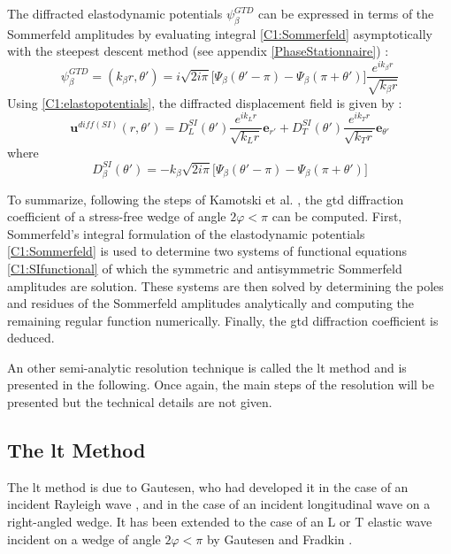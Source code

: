 The diffracted elastodynamic potentials $\psi_{\beta}^{GTD} $ can be expressed in terms of the Sommerfeld amplitudes by evaluating integral \eqref{C1:Sommerfeld} asymptotically with the steepest descent method (see appendix \ref{PhaseStationnaire}) :
\begin{equation}
\psi_{\beta}^{GTD}=(k_{\beta} r,\theta')=i\sqrt{2i\pi}\lbrack \Psi_{\beta}(\theta'-\pi)-\Psi_{\beta}(\pi+\theta')\rbrack \dfrac{e^{ik_{\beta}r}}{\sqrt{k_{\beta}r}}
\end{equation}
Using \eqref{C1:elastopotentials}, the diffracted displacement field is given by :
\begin{equation}
\mathbf{u}^{diff(SI)}(r,\theta')=D_L^{SI}(\theta')\dfrac{e^{ik_Lr}}{\sqrt{k_Lr}}\mathbf{e}_{r'}+D_T^{SI}(\theta')\dfrac{e^{ik_Tr}}{\sqrt{k_Tr}}\mathbf{e}_{\theta'}
\end{equation}
where
\begin{equation}
D_{\beta}^{SI}(\theta')=-k_{\beta}\sqrt{2i\pi}\lbrack \Psi_{\beta}(\theta'-\pi)-\Psi_{\beta}(\pi+\theta')\rbrack
\end{equation}

To summarize, following the steps of Kamotski et al. \cite{KamotskiFradkin}, the \acrshort{gtd} diffraction coefficient of a stress-free wedge of angle $2\varphi<\pi$ can be computed. First, Sommerfeld's integral formulation of the elastodynamic potentials \eqref{C1:Sommerfeld} is used to determine two systems of functional equations \eqref{C1:SIfunctional} of which the symmetric and antisymmetric Sommerfeld amplitudes are solution. These systems are then solved by determining the poles and residues of the Sommerfeld amplitudes analytically and computing the remaining regular function numerically. Finally, the \acrshort{gtd} diffraction coefficient is deduced. 

An other semi-analytic resolution technique is called the \acrfull{lt} method and is presented in the following. Once again, the main steps of the resolution will be presented but the technical details are not given.

\subsection{The \acrfull{lt} Method}
\label{C1:lt}
The \acrfull{lt} method is due to Gautesen, who had developed it in the case of an incident Rayleigh wave \cite{GautesenRayleigh,GautesenRayleigh2,GautesenRayleigh0,GautesenRayleigh4,GautesenRayleigh3}, and in the case of an incident longitudinal wave on a right-angled wedge\cite{GautesenLwave}. It has been extended to the case of an L or T elastic wave incident on a wedge of angle $2\varphi<\pi$ by Gautesen and Fradkin \cite{GautesenFradkin}.

